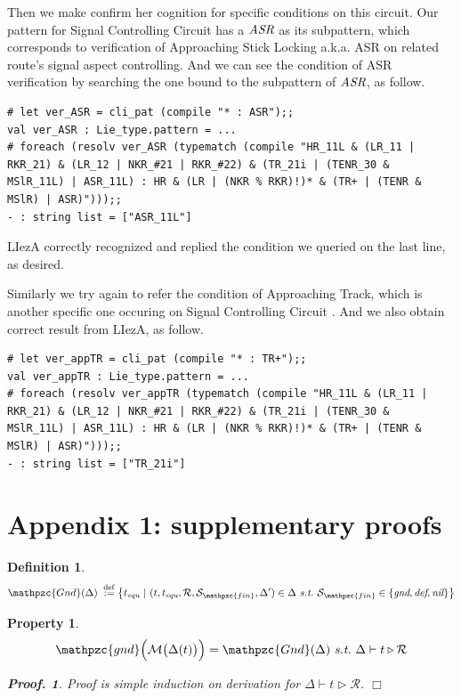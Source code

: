 \documentclass[12pt]{article}
\newtheorem{Definition}{Definition}[section]
\newtheorem{Property}{Property}[section]
\newtheorem{Proof}{Proof.}
\begin{document}
Then we make confirm her cognition for specific conditions on this circuit.
Our pattern for Signal Controlling Circuit has a $\text{\it ASR}$ as
its subpattern, which corresponds to verification of Approaching Stick
Locking a.k.a. ASR on related route's signal aspect controlling.
And we can see the condition of ASR verification by searching the one
bound to the subpattern of $\text{\it ASR}$, as follow.
\begin{verbatim}
# let ver_ASR = cli_pat (compile "* : ASR");;
val ver_ASR : Lie_type.pattern = ...
# foreach (resolv ver_ASR (typematch (compile "HR_11L & (LR_11 |
RKR_21) & (LR_12 | NKR_#21 | RKR_#22) & (TR_21i | (TENR_30 &
MSlR_11L) | ASR_11L) : HR & (LR | (NKR % RKR)!)* & (TR+ | (TENR &
MSlR) | ASR)")));;
- : string list = ["ASR_11L"]
\end{verbatim}
LIezA correctly recognized and replied the condition we queried on
the last line, as desired.

Similarly we try again to refer the condition of Approaching Track, which is
another specific one occuring on Signal Controlling Circuit . And we also
obtain correct result from LIezA, as follow.
\begin{verbatim}
# let ver_appTR = cli_pat (compile "* : TR+");;
val ver_appTR : Lie_type.pattern = ...
# foreach (resolv ver_appTR (typematch (compile "HR_11L & (LR_11 |
RKR_21) & (LR_12 | NKR_#21 | RKR_#22) & (TR_21i | (TENR_30 &
MSlR_11L) | ASR_11L) : HR & (LR | (NKR % RKR)!)* & (TR+ | (TENR &
MSlR) | ASR)")));;
- : string list = ["TR_21i"]
\end{verbatim}


\pagebreak
\section{Appendix 1: supplementary proofs}
\label{Appendix_1}

\begin{Definition}
  \[ \mathpzc{Gnd}(\Delta) \;\stackrel{\mathrm{def}}{:=}
      \bigl\{t_{\text{\it equ}}\ |\ (t, t_{\text{\it equ}}, \mathcal{R},
       \mathcal{S}_{\mathpzc{fin}}, \Delta') \in \Delta\ \text{\it s.t.}\
        \mathcal{S}_{\mathpzc{fin}} \in \{\text{\it gnd}, \text{\it def},
         \text{\it nil} \} \bigr\}
  \]
\end{Definition}


\begin{Property}
  \label{consistency_on_grand_terms}
  \[ \mathpzc{gnd}\Bigl(\mathcal{M}\bigl(\Delta(t) \bigr) \Bigr) =
      \mathpzc{Gnd}(\Delta)\ \text{\it s.t.}\
       \Delta \vdash t \triangleright \mathcal{R}
  \]
  \begin{Proof}
    Proof is simple induction on derivation for
    $\Delta \vdash t \triangleright \mathcal{R}$.
    $\Box$
  \end{Proof}
\end{Property}
\end{document}
